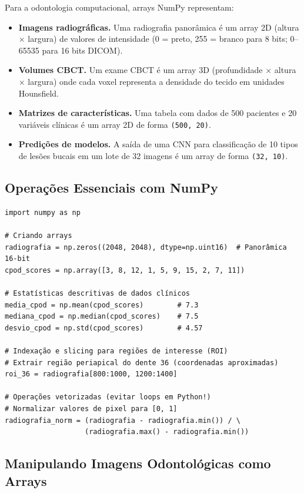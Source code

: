 Para a odontologia computacional, arrays NumPy representam:
\begin{itemize}
    \item \textbf{Imagens radiográficas.} Uma radiografia panorâmica é um array 2D (altura $\times$ largura) de valores de intensidade (0 = preto, 255 = branco para 8 bits; 0--65535 para 16 bits DICOM).
    \item \textbf{Volumes CBCT.} Um exame CBCT é um array 3D (profundidade $\times$ altura $\times$ largura) onde cada voxel representa a densidade do tecido em unidades Hounsfield.
    \item \textbf{Matrizes de características.} Uma tabela com dados de 500 pacientes e 20 variáveis clínicas é um array 2D de forma \texttt{(500, 20)}.
    \item \textbf{Predições de modelos.} A saída de uma CNN para classificação de 10 tipos de lesões bucais em um lote de 32 imagens é um array de forma \texttt{(32, 10)}.
\end{itemize}

\subsection{Operações Essenciais com NumPy}

\begin{verbatim}
import numpy as np

# Criando arrays
radiografia = np.zeros((2048, 2048), dtype=np.uint16)  # Panorâmica 16-bit
cpod_scores = np.array([3, 8, 12, 1, 5, 9, 15, 2, 7, 11])

# Estatísticas descritivas de dados clínicos
media_cpod = np.mean(cpod_scores)        # 7.3
mediana_cpod = np.median(cpod_scores)    # 7.5
desvio_cpod = np.std(cpod_scores)        # 4.57

# Indexação e slicing para regiões de interesse (ROI)
# Extrair região periapical do dente 36 (coordenadas aproximadas)
roi_36 = radiografia[800:1000, 1200:1400]

# Operações vetorizadas (evitar loops em Python!)
# Normalizar valores de pixel para [0, 1]
radiografia_norm = (radiografia - radiografia.min()) / \
                   (radiografia.max() - radiografia.min())
\end{verbatim}

\subsection{Manipulando Imagens Odontológicas como Arrays}

